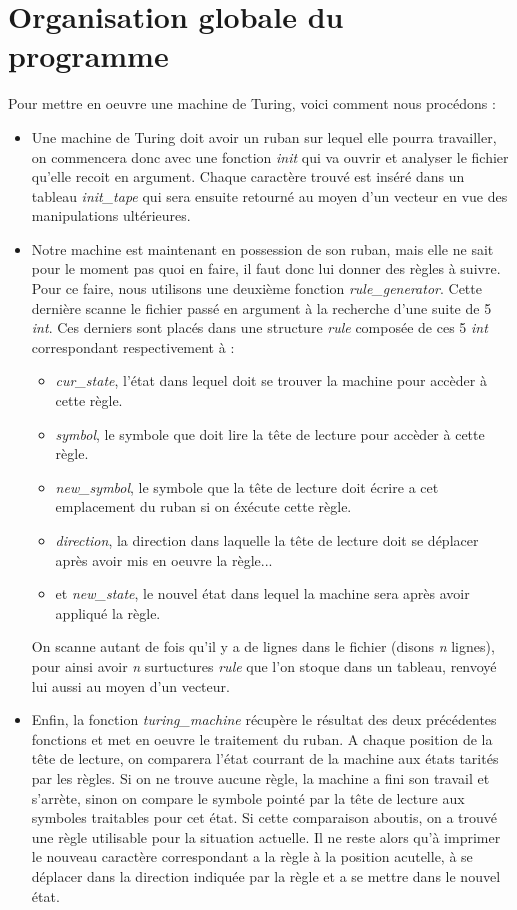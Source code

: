 \documentclass[12pt,a4paper]{report}
\begin{document}
\section{Organisation globale du programme}
Pour mettre en oeuvre une machine de Turing, voici comment nous procédons :
\begin{itemize}
\item Une machine de Turing doit avoir un ruban sur lequel elle pourra travailler, on commencera donc avec une fonction \textit{init} qui va ouvrir et analyser le fichier qu'elle recoit en argument. Chaque caractère trouvé est inséré dans un tableau \textit{init\_tape} qui sera ensuite retourné au moyen d'un vecteur en vue des manipulations ultérieures.
\item Notre machine est maintenant en possession de son ruban, mais elle ne sait pour le moment pas quoi en faire, il faut donc lui donner des règles à suivre. Pour ce faire, nous utilisons une deuxième fonction \textit{rule\_generator}. Cette dernière scanne le fichier passé en argument à la recherche d'une suite de 5 \textit{int}. Ces derniers sont placés dans une structure \textit{rule} composée de ces 5 \textit{int} correspondant respectivement à :
\begin{itemize}
\item \textit{cur\_state}, l'état dans lequel doit se trouver la machine pour accèder à cette règle.
\item \textit{symbol}, le symbole que doit lire la tête de lecture pour accèder à cette règle.
\item \textit{new\_symbol}, le symbole que la tête de lecture doit écrire a cet emplacement du ruban si on éxécute cette règle.
\item \textit{direction}, la direction dans laquelle la tête de lecture doit se déplacer après avoir mis en oeuvre la règle...
\item et \textit{new\_state}, le nouvel état dans lequel la machine sera après avoir appliqué la règle.
\end{itemize}
On scanne autant de fois qu'il y a de lignes dans le fichier (disons \textit{n} lignes), pour ainsi avoir \textit{n} surtuctures \textit{rule} que l'on stoque dans un tableau, renvoyé lui aussi au moyen d'un vecteur.
\item Enfin, la fonction \textit{turing\_machine} récupère le résultat des deux précédentes fonctions et met en oeuvre le traitement du ruban. A chaque position de la tête de lecture, on comparera l'état courrant de la machine aux états tarités par les règles. Si on ne trouve aucune règle, la machine a fini son travail et s'arrète, sinon on compare le symbole pointé par la tête de lecture aux symboles traitables pour cet état. Si cette comparaison aboutis, on a trouvé une règle utilisable pour la situation actuelle. Il ne reste alors qu'à imprimer le nouveau caractère correspondant a la règle à la position acutelle, à se déplacer dans la direction indiquée par la règle et a se mettre dans le nouvel état. 


\end{itemize}
\end{document}

